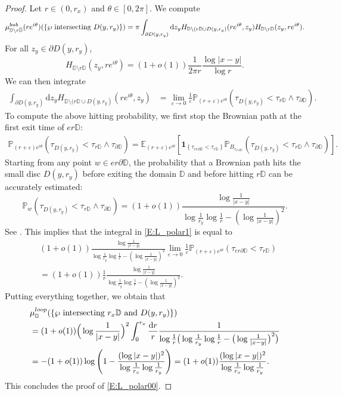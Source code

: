 \documentclass[11pt]{article}
\theoremstyle{remark}
\newcommand{\D}{\mathbb{D}}
\newcommand{\EXPECT}[2]{\mathbb{E}_{#1} \left[ #2 \right] }
\newcommand{\PROB}[2]{\mathbb{P}_{#1} \left( #2 \right) }
\newcommand{\indic}[1]{ \mathbf{1}_{ \left\{ #1 \right\} } }
\newcommand{\eps}{\varepsilon}
\renewcommand{\d}{\mathrm{d}}
\def \loopmeasure{\mu^{\rm loop}}
\def \bubmeasure{\mu^{\rm bub}}
\numberwithin{equation}{section}
\begin{document}
\begin{proof}
Let $r \in (0,r_x)$ and $\theta \in [0,2\pi]$. We compute
\begin{align*}
\bubmeasure_{\D \setminus r \bar{\D}}(r e^{i\theta})( \{ \wp \text{~intersecting~} D(y,r_y) \} )
= \pi \int_{\partial D(y,r_y)} \d z_y
H_{\D \setminus (r \D \cup D(y,r_y)}(r e^{i \theta}, z_y)
H_{\D \setminus r \D}(z_y, re^{i \theta}).
\end{align*}
For all $z_y \in \partial D(y, r_y)$,
\[
H_{\D \setminus r \D}(z_y, re^{i \theta})
= (1+o(1)) \frac{1}{2\pi r} \frac{\log |x-y|}{\log r}.
\]
We can then integrate
\begin{align}
\label{E:L_polar1}
\int_{\partial D(y,r_y)} \d z_y
H_{\D \setminus (r \D \cup D(y,r_y)}(r e^{i \theta}, z_y)
& = \lim_{\eps \to 0} \frac{1}{\eps} \PROB{(r+\eps)e^{i \theta}}{ \tau_{D(y,r_y)} < \tau_{r \D} \wedge \tau_{\partial \D} }.
\end{align}
To compute the above hitting probability, we first stop the Brownian path at the first exit time of $e r \D$:
\begin{align*}
\PROB{(r+\eps)e^{i \theta}}{ \tau_{D(y,r_y)} < \tau_{r \D} \wedge \tau_{\partial \D} }
= \EXPECT{(r+\eps)e^{i \theta}}{ \indic{ \tau_{er \partial \D} < \tau_{r \D} } \PROB{B_{\tau_{e r \partial \D}}}{ \tau_{D(y,r_y)} < \tau_{r \D} \wedge \tau_{\partial \D} } }.
\end{align*}
Starting from any point $w \in er \partial \D$, the probability that a Brownian path hits the small disc $D(y,r_y)$ before exiting the domain $\D$ and before hitting $r \D$ can be accurately estimated:
\begin{equation}
\label{E:L_polar3}
\PROB{w}{ \tau_{D(y,r_y)} < \tau_{r \D} \wedge \tau_{\partial \D}}
= (1+o(1)) \frac{\log \frac{1}{|x-y|}}{\log \frac{1}{r_y} \log \frac{1}{r} - \left( \log \frac{1}{|x-y|} \right)^2}.
\end{equation}
See \cite[Lemma 2.3]{jegoBMC}.
This implies that the integral in \eqref{E:L_polar1} is equal to
\begin{align*}
& (1+o(1)) \frac{\log \frac{1}{|x-y|}}{\log \frac{1}{r_y} \log \frac{1}{r} - \left( \log \frac{1}{|x-y|} \right)^2}
\lim_{\eps \to 0} \frac{1}{\eps} \PROB{(r+\eps)e^{i \theta}}{ \tau_{er \partial \D} < \tau_{r \D} } \\
& = (1+o(1)) \frac{1}{r} \frac{\log \frac{1}{|x-y|}}{\log \frac{1}{r_y} \log \frac{1}{r} - \left( \log \frac{1}{|x-y|} \right)^2}.
\end{align*}
Putting everything together, we obtain that
\begin{align*}
& \loopmeasure_\D( \{ \wp \text{~intersecting~} r_x \D \text{~and~} D(y,r_y) \} ) \\
& = (1+o(1)) \Big( \log \frac{1}{|x-y|} \Big)^2 \int_0^{r_x} \frac{\d r}{r}
\frac{1}{\log \frac{1}{r} \big( \log \frac{1}{r_y} \log \frac{1}{r} - \big( \log \frac{1}{|x-y|} \big)^2 \big) } \\
& = - (1+o(1)) \log \left( 1 - \frac{(\log |x-y|)^2}{\log \frac{1}{r_x} \log \frac{1}{r_y}} \right)
= (1+o(1)) \frac{(\log |x-y|)^2}{\log \frac{1}{r_x} \log \frac{1}{r_y}}.
\end{align*}
This concludes the proof of \eqref{E:L_polar00}.


\end{proof}
\end{document}
